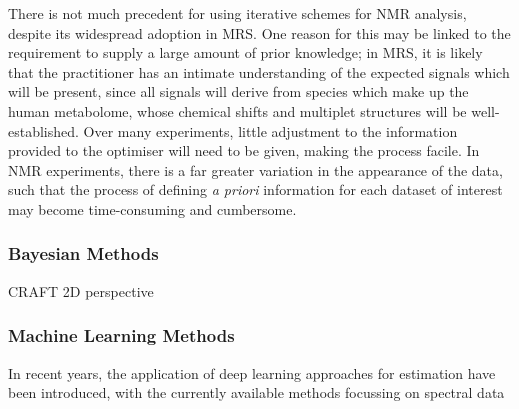 There is not much precedent for using iterative schemes for \ac{NMR} analysis,
despite its widespread adoption in \ac{MRS}. One reason for this may be linked
to the requirement to supply a large amount of prior knowledge; in \ac{MRS}, it
is likely that the practitioner has an intimate understanding of the expected signals
which will be present, since all signals will derive from species
which make up the human metabolome, whose chemical shifts and multiplet
structures will be well-established. Over many experiments, little adjustment
to the information provided to the optimiser will need to be given, making the
process facile. In \ac{NMR} experiments, there is a far greater variation in
the appearance of the data, such that the process of defining \textit{a priori} information for each dataset of interest may become time-consuming and cumbersome.

\subsubsection{Bayesian Methods}
\ac{CRAFT}\cite{Krishnamurthy2013}
2D\cite{Krishnamurthy2017}
perspective\cite{Krishnamurthy2021}

\subsubsection{Machine Learning Methods}
In recent years, the application of deep learning approaches for estimation have been
introduced, with the currently available methods focussing on spectral
data\cite{Li2021,Schmid2023}

